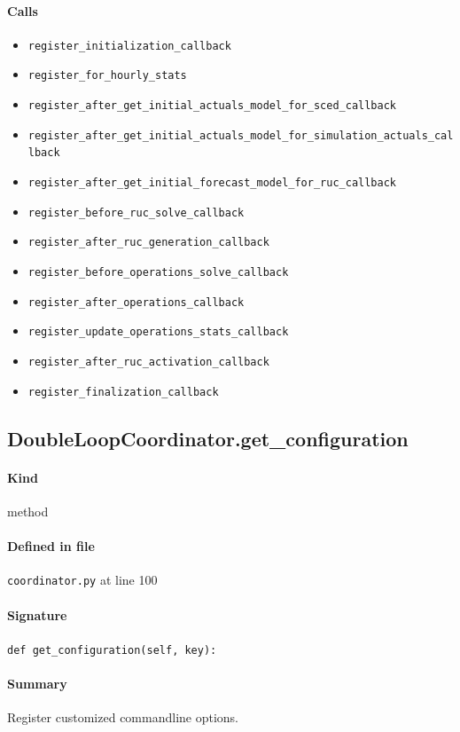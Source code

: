 \documentclass[11pt]{report}
\begin{document}
\paragraph{Calls}
\begin{itemize}[leftmargin=*]
  \item \texttt{register\_initialization\_callback}
  \item \texttt{register\_for\_hourly\_stats}
  \item \texttt{register\_after\_get\_initial\_actuals\_model\_for\_sced\_callback}
  \item \texttt{register\_after\_get\_initial\_actuals\_model\_for\_simulation\_actuals\_callback}
  \item \texttt{register\_after\_get\_initial\_forecast\_model\_for\_ruc\_callback}
  \item \texttt{register\_before\_ruc\_solve\_callback}
  \item \texttt{register\_after\_ruc\_generation\_callback}
  \item \texttt{register\_before\_operations\_solve\_callback}
  \item \texttt{register\_after\_operations\_callback}
  \item \texttt{register\_update\_operations\_stats\_callback}
  \item \texttt{register\_after\_ruc\_activation\_callback}
  \item \texttt{register\_finalization\_callback}
\end{itemize}
\subsection{DoubleLoopCoordinator.get\_configuration}
\label{def:coordinator.py:DoubleLoopCoordinator.get_configuration:L100}
\paragraph{Kind} method
\paragraph{Defined in file} \texttt{coordinator.py} at line 100
\paragraph{Signature} \texttt{def get\_configuration(self, key):}
\paragraph{Summary} Register customized commandline options.
\end{document}
